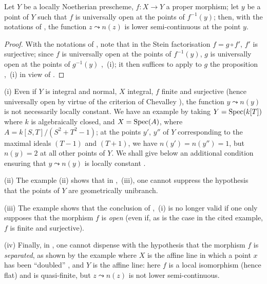 \begin{corollary}[15.5.4]
\label{IV.15.5.4}
Let $Y$ be a locally Noetherian prescheme, $f:X\to Y$ a proper morphism; let $y$ be a point of $Y$ such that $f$ is universally open at the points of $f^{-1}(y)$;
then, with the notations of , the function $z\leadsto n(z)$ is lower semi-continuous at the point $y$.
\end{corollary}

\begin{proof}
With the notations of , note that in the Stein factorisation $f=g\circ f'$, $f'$ is surjective; since $f$ is universally open at the points of $f^{-1}(y)$, $g$ is universally open at the points of $g^{-1}(y)$ ,~(i); it then suffices to apply to $g$ the proposition ,~(i) in view of .
\end{proof}

\begin{remarks}[15.5.5]
\label{IV.15.5.5}
(i)
Even if $Y$ is integral and normal, $X$ integral, $f$ finite and surjective (hence universally open by virtue of the criterion of Chevalley ), the function $y\leadsto n(y)$ is not necessarily locally constant.
We have an example by taking $Y=\operatorname{Spec}(k[T])$ where $k$ is algebraically closed, and $X=\operatorname{Spec}(A)$, where $A=k[S,T]/(S^2+T^2-1)$; at the points $y'$, $y''$ of $Y$ corresponding to the maximal ideals $(T-1)$ and $(T+1)$, we have $n(y')=n(y'')=1$, but $n(y)=2$ at all other points of $Y$.
We shall give below an additional condition ensuring that $y\leadsto n(y)$ is locally constant .

(ii)
The example  (ii) shows that in ,~(iii), one cannot suppress the hypothesis that the points of $Y$ are geometrically unibranch.

(iii)
The example  shows that the conclusion of ,~(i) is no longer valid if one only supposes that the morphism $f$ is \emph{open} (even if, as is the case in the cited example, $f$ is finite and surjective).

(iv)
Finally, in , one cannot dispense with the hypothesis that the morphism $f$ is \emph{separated}, as shown by the example where $X$ is the affine line in which a point $x$ has been ``doubled'' , and $Y$ is the affine line: here $f$ is a local isomorphism (hence flat) and is quasi-finite, but $z\leadsto n(z)$ is not lower semi-continuous.
\end{remarks}

